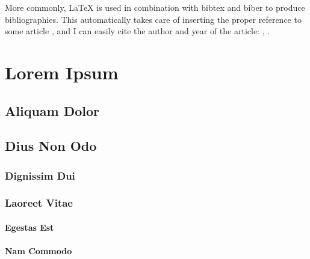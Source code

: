 \documentclass[twoside, onecolumn, portait, bibliography=totoc, parskip=half*]{scrartcl}
\begin{document}
More commonly, LaTeX is used in combination with \gls{bibtex} and \gls{biber} to
produce bibliographies.  This automatically takes care of inserting the proper
reference to some article \cite{Smith2013}, and I can easily cite the author and
year of the article: \citeauthor{Smith2013}, \citeyear{Smith2013}.


\clearpage
\section{Lorem Ipsum}

\lipsum[1-4]

\subsection{Aliquam Dolor}

\lipsum[6-9]

\subsection{Dius Non Odo}

\lipsum[10]

\subsubsection{Dignissim Dui}

\lipsum[11-12]

\subsubsection{Laoreet Vitae}

\lipsum[13-15]

\paragraph{Egestas Est} \lipsum[16]

\paragraph{Nam Commodo} \lipsum[17]

\lipsum[18-22]


\cleardoublepage
\appendix
{}
\pagestyle{plain}

\cleardoublepage

\printglossaries

\cleardoublepage
\pagestyle{plain}
\printbibliography
\end{document}
